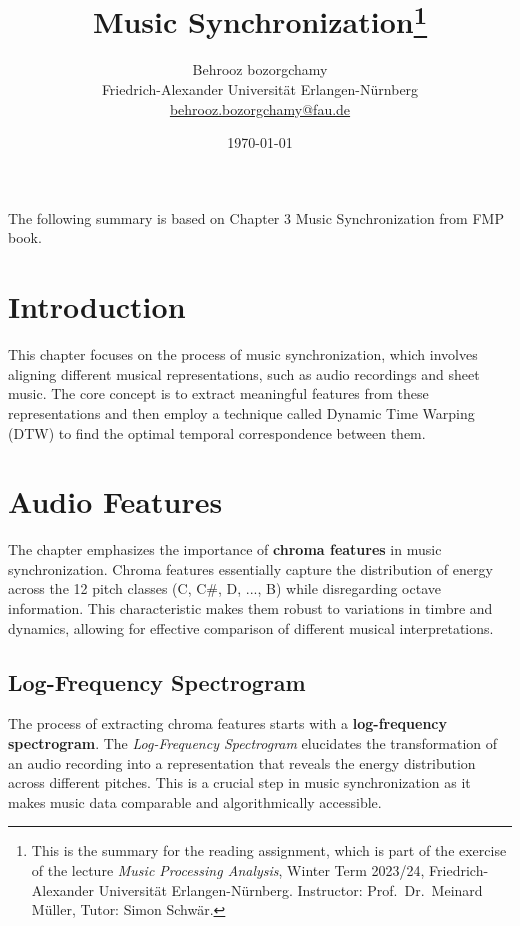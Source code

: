 \documentclass[a4paper, 9pt, twocolumn]{extarticle}
\begin{document}
\date{\normalsize \today}

\title{\vspace{-8mm}\textbf{\Large
Music Synchronization\footnote{This is the summary for the reading assignment,
which is part of the exercise of the lecture \emph{Music Processing Analysis}, Winter Term 2023/24,
Friedrich-Alexander Universit\"at Erlangen-N\"urnberg.
Instructor: Prof.\ Dr.\ Meinard M\"uller,
Tutor: Simon Schw\"ar.
}}}

\author{
{
\begin{minipage}{\textwidth}
\center
Behrooz bozorgchamy\\
\small
Friedrich-Alexander Universit\"at Erlangen-N\"urnberg
\protect\\{} %
\url{behrooz.bozorgchamy@fau.de}
\end{minipage}
}
}

\maketitle
\thispagestyle{empty}
The following summary is based on Chapter 3 Music Synchronization from FMP book\cite{Mueller21_FMP_SPRINGER}.
\section{Introduction}
\label{section:introduction}

This chapter focuses on the process of music synchronization, which
involves aligning different musical representations, such as audio
recordings and sheet music. The core concept is to extract meaningful
features from these representations and then employ a technique called
Dynamic Time Warping (DTW) to find the optimal temporal correspondence
between them.
\section{Audio Features}
The chapter emphasizes the importance of \textbf{chroma features} in music
synchronization. Chroma features essentially capture the distribution of
energy across the 12 pitch classes (C, C\#, D, ..., B) while
disregarding octave information. This characteristic makes them robust
to variations in timbre and dynamics, allowing for effective comparison
of different musical interpretations.
\subsection{Log-Frequency Spectrogram}
The process of extracting chroma features starts with a
\textbf{log-frequency spectrogram}. The \emph{Log-Frequency Spectrogram}
elucidates the transformation of an audio recording into a
representation that reveals the energy distribution across different
pitches. This is a crucial step in music synchronization as it makes
music data comparable and algorithmically accessible.
\end{document}
